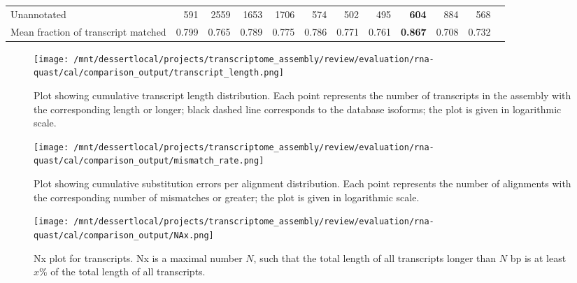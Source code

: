 \documentclass[12pt,a4paper]{article}
\begin{document}
\begin{table}[t]
\begin{adjustbox}{width=1\textwidth}
\begin{tabular}{|l*{11}{|r}|}
Unannotated                                             & 591                    & 2559                   & 1653                   & 1706                   & 574                    & 502                    & 495                    & \textbf{604}           & 884                    & 568                    \\
Mean fraction of transcript matched                     & 0.799                  & 0.765                  & 0.789                  & 0.775                  & 0.786                  & 0.771                  & 0.761                  & \textbf{0.867}         & 0.708                  & 0.732                  \\ \hline
\end{tabular}
\end{adjustbox}
\end{table}

\FloatBarrier
\clearpage
{}

\begin{figure}[t]
\centering
\texttt{[image: /mnt/dessertlocal/projects/transcriptome\_assembly/review/evaluation/rna-quast/cal/comparison\_output/transcript\_length.png]}
\caption{Plot showing cumulative transcript length distribution. Each point represents the number of transcripts in the assembly with the corresponding length or longer; black dashed line corresponds to the database isoforms; the plot is given in logarithmic scale.}
\end{figure}
\FloatBarrier
\clearpage


\begin{figure}[t]
\centering
\texttt{[image: /mnt/dessertlocal/projects/transcriptome\_assembly/review/evaluation/rna-quast/cal/comparison\_output/mismatch\_rate.png]}
\caption{Plot showing cumulative substitution errors per alignment distribution. Each point represents the number of alignments with the corresponding number of mismatches or greater; the plot is given in logarithmic scale.}
\end{figure}
\FloatBarrier
\clearpage


\begin{figure}[t]
\centering
\texttt{[image: /mnt/dessertlocal/projects/transcriptome\_assembly/review/evaluation/rna-quast/cal/comparison\_output/NAx.png]}
\caption{Nx plot for transcripts. Nx is a maximal number $N$, such that the total length of all transcripts longer than $N$ bp is at least $x\%$ of the total length of all transcripts.}
\end{figure}
\FloatBarrier
\clearpage
\end{document}
